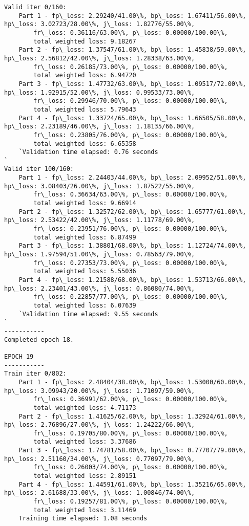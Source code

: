 \documentclass[11pt]{article}
\begin{document}
\begin{Verbatim}[commandchars=\\\{\}]
Valid iter 0/160:
	Part 1 - fp\_loss: 2.29240/41.00\%, bp\_loss: 1.67411/56.00\%, hp\_loss: 3.02723/28.00\%, j\_loss: 1.82776/55.00\%, 
		fr\_loss: 0.36116/63.00\%, p\_loss: 0.00000/100.00\%, 
		total weighted loss: 9.18267
	Part 2 - fp\_loss: 1.37547/61.00\%, bp\_loss: 1.45838/59.00\%, hp\_loss: 2.56812/42.00\%, j\_loss: 1.28338/63.00\%, 
		fr\_loss: 0.26185/73.00\%, p\_loss: 0.00000/100.00\%, 
		total weighted loss: 6.94720
	Part 3 - fp\_loss: 1.47732/63.00\%, bp\_loss: 1.09517/72.00\%, hp\_loss: 1.92915/52.00\%, j\_loss: 0.99533/73.00\%, 
		fr\_loss: 0.29946/70.00\%, p\_loss: 0.00000/100.00\%, 
		total weighted loss: 5.79643
	Part 4 - fp\_loss: 1.33724/65.00\%, bp\_loss: 1.66505/58.00\%, hp\_loss: 2.23189/46.00\%, j\_loss: 1.18135/66.00\%, 
		fr\_loss: 0.23805/76.00\%, p\_loss: 0.00000/100.00\%, 
		total weighted loss: 6.65358
	`Validation time elapsed: 0.76 seconds
`
Valid iter 100/160:
	Part 1 - fp\_loss: 2.24403/44.00\%, bp\_loss: 2.09952/51.00\%, hp\_loss: 3.08403/26.00\%, j\_loss: 1.87522/55.00\%, 
		fr\_loss: 0.36634/63.00\%, p\_loss: 0.00000/100.00\%, 
		total weighted loss: 9.66914
	Part 2 - fp\_loss: 1.32572/62.00\%, bp\_loss: 1.65777/61.00\%, hp\_loss: 2.53422/42.00\%, j\_loss: 1.11778/69.00\%, 
		fr\_loss: 0.23951/76.00\%, p\_loss: 0.00000/100.00\%, 
		total weighted loss: 6.87499
	Part 3 - fp\_loss: 1.38801/68.00\%, bp\_loss: 1.12724/74.00\%, hp\_loss: 1.97594/51.00\%, j\_loss: 0.78563/79.00\%, 
		fr\_loss: 0.27353/73.00\%, p\_loss: 0.00000/100.00\%, 
		total weighted loss: 5.55036
	Part 4 - fp\_loss: 1.21588/68.00\%, bp\_loss: 1.53713/66.00\%, hp\_loss: 2.23401/43.00\%, j\_loss: 0.86080/74.00\%, 
		fr\_loss: 0.22857/77.00\%, p\_loss: 0.00000/100.00\%, 
		total weighted loss: 6.07639
	`Validation time elapsed: 9.55 seconds
`
-----------
Completed epoch 18.

EPOCH 19
-----------
Train iter 0/802:
	Part 1 - fp\_loss: 2.48404/38.00\%, bp\_loss: 1.53000/60.00\%, hp\_loss: 3.09943/20.00\%, j\_loss: 1.71097/59.00\%, 
		fr\_loss: 0.36991/62.00\%, p\_loss: 0.00000/100.00\%, 
		total weighted loss: 4.71173
	Part 2 - fp\_loss: 1.41625/62.00\%, bp\_loss: 1.32924/61.00\%, hp\_loss: 2.76896/27.00\%, j\_loss: 1.24222/66.00\%, 
		fr\_loss: 0.19705/80.00\%, p\_loss: 0.00000/100.00\%, 
		total weighted loss: 3.37686
	Part 3 - fp\_loss: 1.74781/58.00\%, bp\_loss: 0.77707/79.00\%, hp\_loss: 2.51160/34.00\%, j\_loss: 0.77097/79.00\%, 
		fr\_loss: 0.26003/74.00\%, p\_loss: 0.00000/100.00\%, 
		total weighted loss: 2.89151
	Part 4 - fp\_loss: 1.44591/61.00\%, bp\_loss: 1.35216/65.00\%, hp\_loss: 2.61688/33.00\%, j\_loss: 1.00846/74.00\%, 
		fr\_loss: 0.19257/81.00\%, p\_loss: 0.00000/100.00\%, 
		total weighted loss: 3.11469
	Training time elapsed: 1.08 seconds


\end{Verbatim}
\end{document}
